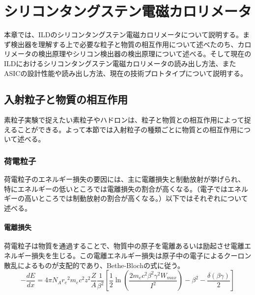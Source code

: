 
\chapter{シリコンタングステン電磁カロリメータ} \label{sec:1.Siwecal}
本章では、ILDのシリコンタングステン電磁カロリメータについて説明する。まず検出器を理解する上で必要な粒子と物質の相互作用について述べたのち、カロリメータの検出原理やシリコン検出器の検出原理について述べる。そして現在のILDにおけるシリコンタングステン電磁カロリメータの読み出し方法、またASICの設計性能や読み出し方法、現在の技術プロトタイプについて説明する。
\section{入射粒子と物質の相互作用}
素粒子実験で捉えたい素粒子やハドロンは、粒子と物質との相互作用によって捉えることができる。よって本節では入射粒子の種類ごとに物質との相互作用について述べる。
\subsection{荷電粒子}
荷電粒子のエネルギー損失の要因には、主に電離損失と制動放射が挙げられ、特にエネルギーの低いところでは電離損失の割合が高くなる。（電子ではエネルギーの高いところでは制動放射の割合が高くなる。）以下ではそれぞれについて述べる。
\subsubsection{電離損失}
荷電粒子は物質を通過することで、物質中の原子を電離あるいは励起させ電離エネルギー損失を生じる。この電離エネルギー損失は原子中の電子によるクーロン散乱によるものが支配的であり、Bethe-Blochの式に従う。
\begin{equation}
-\frac{dE}{dx} = 4\pi N_A {r_e}^2 m_e c^2 z^2 \frac{Z}{A} \frac{1}{{\beta}^2} \left[ \frac{1}{2} \ln(\frac{2m_e c^2{\beta}^2{\gamma}^2W_{max}}{I^2}) -{\beta}^2 - \frac{\delta(\beta \gamma)}{2} \right]
\end{equation}

